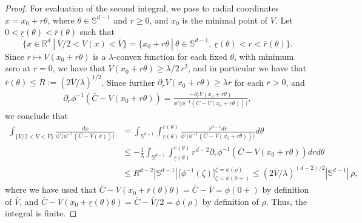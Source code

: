 \documentclass[10pt,a4paper]{amsart}
\newcommand{\Rd}{{\R^d}}
\newcommand{\R}{\mathbb{R}}
\begin{document}
\begin{proof}
    For evaluation of the second integral, we pass to radial coordinates $x=x_0+r\theta$, where $\theta\in{\mathbb S}^{d-1}$ and $r\ge0$, and $x_0$ is the minimal point of $V$. Let $0<\underline r(\theta)<\overline r(\theta)$ such that
    \[ \{x\in\Rd\ |\ \bar V/2< V(x) < \bar V\} = \{ x_0+r\theta\ |\ \theta\in\mathbb{S}^{d-1},\ \underline r(\theta)<r<\overline r(\theta) \}. \]
    Since $r\mapsto V(x_0+r\theta)$ is a $\lambda$-convex function for each fixed $\theta$, with minimum zero at $r=0$, we have that $V(x_0+r\theta)\ge \lambda/2\,r^2$, and in particular we have that $\overline r(\theta)\le R:=(2\bar V/\lambda)^{1/2}$. Since further $\partial_r V(x_0+r\theta)\ge\lambda r$ for each $r>0$, and
    \begin{align*}
        \partial_r\phi^{-1}(\bar C-V(x_0+r\theta)) = \frac{-\partial_rV(x_0+r\theta)}{\phi'\big(\phi^{-1}(\bar C-V(x_0+r\theta))\big)},
    \end{align*}
    we conclude that
    \begin{align*}
        \int_{\{ \bar V/2< V<\bar V\}}\frac{dx}{\phi'\big(\phi^{-1}(\bar C-V(x))\big)}
        &= \int_{{\mathbb S}^{d-1}} \int_{\underline r(\theta)}^{\overline r(\theta)} \frac{r^{d-1} dr}{\phi'\big(\phi^{-1}(\bar C-V(x_0+r\theta))\big)} d\theta\\
        &\le -\frac1\lambda\int_{{\mathbb S}^{d-1}} \int_{\underline r(\theta)}^{\overline r(\theta)} r^{d-2}\partial_r\phi^{-1}(\bar C-V(x_0+r\theta)) dr d\theta \\
        &\le R^{d-2}|\mathbb{S}^{d-1}|\,\big[\phi^{-1}(\zeta)\big]_{\zeta=\phi(0+)}^{\zeta=\phi(\rho)}
        \le (2\bar V/\lambda)^{(d-2)/2}|\mathbb{S}^{d-1}|\,\rho,
    \end{align*}     
    where we have used that $\bar C-V(x_0+\overline r(\theta)\theta)=\bar C-\bar V=\phi(0+)$ by definition of $\bar V$, and $\bar C-V(x_0+\underline r(\theta)\theta)=\bar C-\bar V/2=\phi(\rho)$ by definition of $\rho$. 
    Thus, the integral is finite.
\end{proof}
\end{document}
